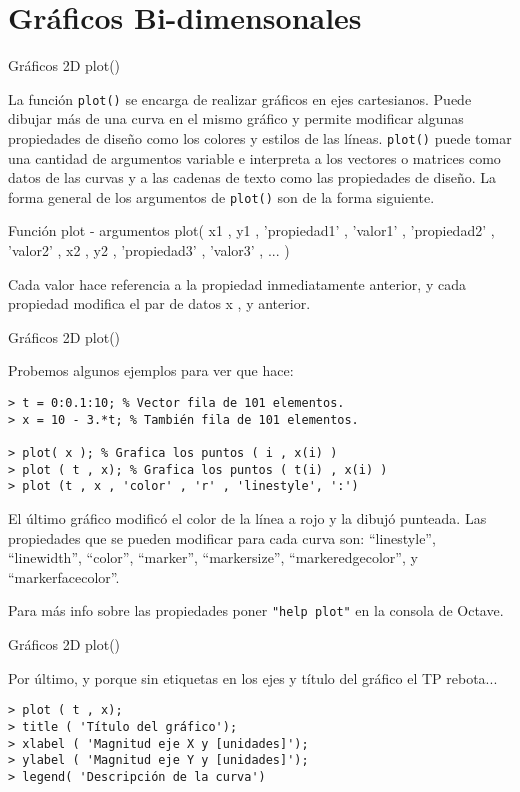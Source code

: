\section{Gráficos Bi-dimensonales}

\begin{frame}[fragile]{Gráficos 2D plot()}

La función \verb!plot()! se encarga de realizar gráficos en ejes cartesianos. Puede dibujar más de una curva en el mismo gráfico y permite modificar algunas propiedades de diseño como los colores y estilos de las líneas. \verb!plot()! puede tomar una cantidad de argumentos variable e interpreta a los vectores o matrices como datos de las curvas y a las cadenas de texto como las propiedades de diseño. La forma general de los argumentos de \verb!plot()! son de la forma siguiente.

\begin{alertblock}{Función plot - argumentos}
plot( x1 , y1 , 'propiedad1' , 'valor1' , 'propiedad2' , 'valor2' , x2 , y2 , 'propiedad3' , 'valor3' , ... ) 

Cada valor hace referencia a la propiedad inmediatamente anterior, y cada propiedad modifica el par de datos x , y anterior.
\end{alertblock}

\end{frame}

\begin{frame}[fragile]{Gráficos 2D plot()}

Probemos algunos ejemplos para ver que hace:

\begin{lstlisting}
> t = 0:0.1:10; % Vector fila de 101 elementos.
> x = 10 - 3.*t; % También fila de 101 elementos.

> plot( x ); % Grafica los puntos ( i , x(i) )
> plot ( t , x); % Grafica los puntos ( t(i) , x(i) )
> plot (t , x , 'color' , 'r' , 'linestyle', ':')
\end{lstlisting}

El último gráfico modificó el color de la línea a rojo y la dibujó punteada. Las propiedades que se pueden modificar para cada curva son: ``linestyle'', ``linewidth'', ``color'', ``marker'', ``markersize'', ``markeredgecolor'', y ``markerfacecolor''.

Para más info sobre las propiedades poner \verb!"help plot"! en la consola de Octave.
\end{frame}

\begin{frame}[fragile]{Gráficos 2D plot()}

Por último, y porque sin etiquetas en los ejes y título del gráfico el TP rebota...

\begin{lstlisting}
> plot ( t , x);
> title ( 'Título del gráfico');
> xlabel ( 'Magnitud eje X y [unidades]');
> ylabel ( 'Magnitud eje Y y [unidades]');
> legend( 'Descripción de la curva')
\end{lstlisting}

\end{frame}

